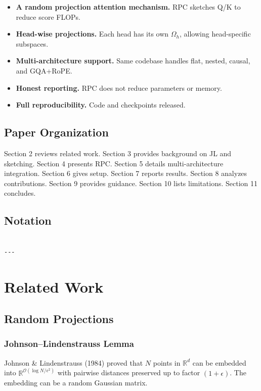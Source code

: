\begin{itemize}
\item \textbf{A random projection attention mechanism.} RPC sketches Q/K to reduce
  score FLOPs.
\item \textbf{Head-wise projections.} Each head has its own $\Omega_h$, allowing
  head-specific subspaces.
\item \textbf{Multi-architecture support.} Same codebase handles flat, nested,
  causal, and GQA+RoPE.
\item \textbf{Honest reporting.} RPC does not reduce parameters or memory.
\item \textbf{Full reproducibility.} Code and checkpoints released.

\end{itemize}
\subsection{Paper Organization}

Section 2 reviews related work. Section 3 provides background on JL and 
sketching. Section 4 presents RPC. Section 5 details multi-architecture 
integration. Section 6 gives setup. Section 7 reports results. Section 8 
analyzes contributions. Section 9 provides guidance. Section 10 lists 
limitations. Section 11 concludes.



\subsection{Notation}

\begin{lstlisting}

---
\end{lstlisting}


\section{Related Work}

\subsection{Random Projections}

\subsubsection{Johnson--Lindenstrauss Lemma}

Johnson \& Lindenstrauss (1984) proved that $N$ points in $\mathbb{R}^d$ can 
be embedded into $\mathbb{R}^{\mathcal{O}(\log N / \epsilon^2)}$ with 
pairwise distances preserved up to factor $(1 + \epsilon)$. The embedding 
can be a random Gaussian matrix.

